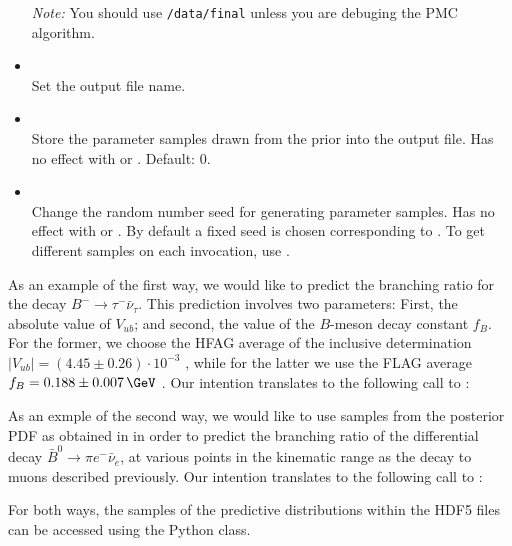 \begin{itemize}
        \emph{Note:} You should use \texttt{/data/final} unless you are
        debuging the PMC algorithm.

    \item[] \\[\medskipamount]
        Set the output file name.

    \item[] \\[\medskipamount]
        Store the parameter samples drawn from the prior into the output file. Has
        no effect with  or . Default: 0.

    \item[] \\[\medskipamount]
        Change the random number seed for generating parameter samples. Has no
        effect with  or . By default a fixed
        seed is chosen corresponding to . To get different samples on
        each invocation, use .

\end{itemize}

As an example of the first way, we would like to predict the branching
ratio for the decay $B^- \to \tau^- \bar{\nu}_\tau$. This prediction involves
two parameters: First, the absolute value of $V_{ub}$; and second, the value
of the $B$-meson decay constant $f_{B}$. For the former, we choose the
HFAG average of the inclusive determination $|V_{ub}| = (4.45 \pm 0.26) \cdot 10^{-3}$
\cite{Amhis:2014hma}, while for the latter we use the FLAG average
$f_{B} = 0.188 \pm 0.007\,\GeV$ \cite{Aoki:2013ldr}.
Our intention translates to the following call to :

As an exmple of the second way, we would like to use samples from the posterior
PDF as obtained in  in order to predict the
branching ratio of the differential decay $\bar{B}^0\to \pi e^- \bar{\nu}_e$, at various
points in the kinematic range as the decay to muons described previously.
Our intention translates to the following call to :

For both ways, the samples of the predictive distributions within the HDF5 files
can be accessed using the  Python class.

